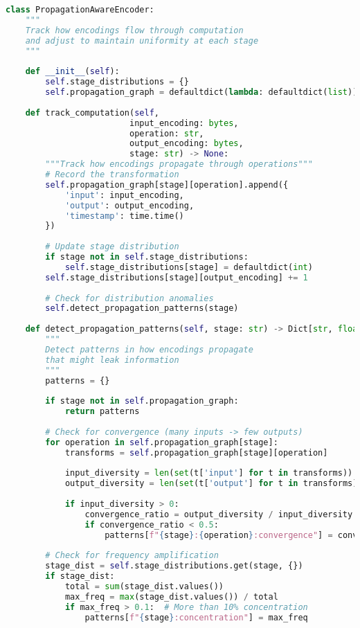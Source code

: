 \begin{lstlisting}[language=Python, caption={Tracking distribution through computation}]
class PropagationAwareEncoder:
    """
    Track how encodings flow through computation
    and adjust to maintain uniformity at each stage
    """
    
    def __init__(self):
        self.stage_distributions = {}
        self.propagation_graph = defaultdict(lambda: defaultdict(list))
        
    def track_computation(self, 
                         input_encoding: bytes,
                         operation: str,
                         output_encoding: bytes,
                         stage: str) -> None:
        """Track how encodings propagate through operations"""
        # Record the transformation
        self.propagation_graph[stage][operation].append({
            'input': input_encoding,
            'output': output_encoding,
            'timestamp': time.time()
        })
        
        # Update stage distribution
        if stage not in self.stage_distributions:
            self.stage_distributions[stage] = defaultdict(int)
        self.stage_distributions[stage][output_encoding] += 1
        
        # Check for distribution anomalies
        self.detect_propagation_patterns(stage)
    
    def detect_propagation_patterns(self, stage: str) -> Dict[str, float]:
        """
        Detect patterns in how encodings propagate
        that might leak information
        """
        patterns = {}
        
        if stage not in self.propagation_graph:
            return patterns
        
        # Check for convergence (many inputs -> few outputs)
        for operation in self.propagation_graph[stage]:
            transforms = self.propagation_graph[stage][operation]
            
            input_diversity = len(set(t['input'] for t in transforms))
            output_diversity = len(set(t['output'] for t in transforms))
            
            if input_diversity > 0:
                convergence_ratio = output_diversity / input_diversity
                if convergence_ratio < 0.5:
                    patterns[f"{stage}:{operation}:convergence"] = convergence_ratio
        
        # Check for frequency amplification
        stage_dist = self.stage_distributions.get(stage, {})
        if stage_dist:
            total = sum(stage_dist.values())
            max_freq = max(stage_dist.values()) / total
            if max_freq > 0.1:  # More than 10% concentration
                patterns[f"{stage}:concentration"] = max_freq
        

\end{lstlisting}
